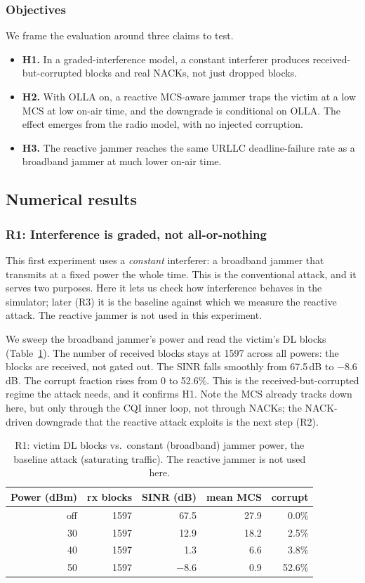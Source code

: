 \documentclass[conference]{IEEEtran}
\begin{document}
\subsubsection{Objectives}
We frame the evaluation around three claims to test.
\begin{itemize}
\item \textbf{H1.} In a graded-interference model, a constant interferer produces
received-but-corrupted blocks and real NACKs, not just dropped blocks.
\item \textbf{H2.} With OLLA on, a reactive MCS-aware jammer traps the victim at a low
MCS at low on-air time, and the downgrade is conditional on OLLA. The effect emerges
from the radio model, with no injected corruption.
\item \textbf{H3.} The reactive jammer reaches the same URLLC deadline-failure rate as
a broadband jammer at much lower on-air time.
\end{itemize}

\subsection{Numerical results}

\subsubsection*{R1: Interference is graded, not all-or-nothing}
This first experiment uses a \emph{constant} interferer: a broadband jammer that
transmits at a fixed power the whole time. This is the conventional attack, and it serves
two purposes. Here it lets us check how interference behaves in the simulator; later
(R3) it is the baseline against which we measure the reactive attack.
The reactive jammer is not used in this experiment.

We sweep the broadband jammer's power and read the victim's DL blocks
(Table~\ref{tab:r1}). The number of received blocks stays at 1597 across all powers:
the blocks are received, not gated out. The SINR falls smoothly from 67.5\,dB to
$-8.6$\,dB. The corrupt fraction rises from 0 to 52.6\%. This is the
received-but-corrupted regime the attack needs, and it confirms H1. Note the MCS already
tracks down here, but only through the CQI inner loop, not through NACKs; the
NACK-driven downgrade that the reactive attack exploits is the next step (R2).

\begin{table}[t]\centering
\caption{R1: victim DL blocks vs.\ constant (broadband) jammer power, the baseline attack
(saturating traffic). The reactive jammer is not used here.}
\label{tab:r1}
\begin{tabular}{rrrrr}\toprule
Power (dBm) & rx blocks & SINR (dB) & mean MCS & corrupt \\\midrule
off & 1597 & 67.5 & 27.9 & 0.0\% \\
30  & 1597 & 12.9 & 18.2 & 2.5\% \\
40  & 1597 & 1.3  & 6.6  & 3.8\% \\
50  & 1597 & $-8.6$ & 0.9 & 52.6\% \\\bottomrule
\end{tabular}\end{table}
\end{document}
